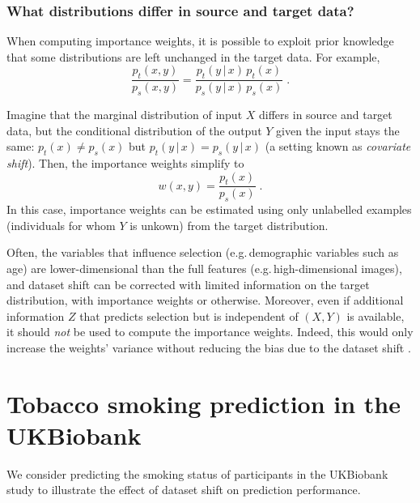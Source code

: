 \documentclass[twocolumn]{article}
\newcommand{\giv}{ \,|\, }
\newcommand{\eg}{e.g.\,}
\begin{document}
\subsubsection{What distributions differ in source and target data?}

When computing importance weights, it is possible to exploit prior knowledge that some distributions are left
unchanged in the target data.
%
For example,
\begin{equation}
  \frac{p_t(x, y)}{p_s(x, y)} = \frac{p_t(y \giv x)\,p_t(x)}{p_s(y \giv x)\,p_s(x)} \; .
\end{equation}
%


Imagine that the marginal distribution of input \(X\) differs in source and
target data, but the conditional distribution of the output \(Y\) given the input
stays the same: \(p_t(x) \neq p_s(x)\) but \(p_t(y \giv x) = p_s(y \giv x)\) (a
setting known as \emph{covariate shift}). Then, the importance weights
simplify to
\begin{equation}
  w(x, y) = \frac{p_t(x)}{p_s(x)} \; .
\end{equation}
%
In this case, importance weights can be estimated using only unlabelled examples
(individuals for whom \(Y\) is unkown) from the target distribution.
%

Often, the variables that influence selection (\eg demographic variables such as
age) are lower-dimensional than the full features (\eg high-dimensional images),
and dataset shift can be corrected with limited information on the target
distribution, with importance weights or otherwise.
%
Moreover, even if additional information \(Z\) that predicts
selection but is independent of \((X, Y)\) is available, it should \emph{not} be used to
compute the importance weights. Indeed, this would only increase the weights'
variance without reducing the bias due to the dataset shift \citep[Sec.
15.5]{hernan2020causal}.

\section{Tobacco smoking prediction in the UKBiobank}
\label{sec:ukb-experiment-details}
We consider predicting the smoking status of participants in the UKBiobank study to illustrate the effect of dataset shift on prediction performance.
\end{document}
